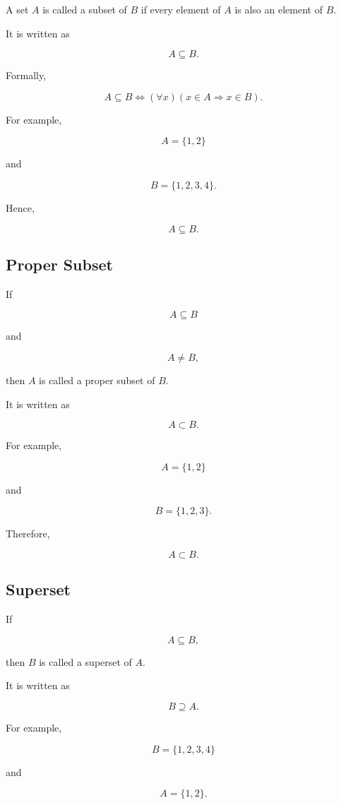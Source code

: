 \documentclass[12pt,a4paper]{article}
\begin{document}
A set $A$ is called a subset of $B$ if every element of $A$ is also an element
of $B$.

It is written as

\[
A\subseteq B.
\]

Formally,

\[
A\subseteq B
\iff
(\forall x)(x\in A\Rightarrow x\in B).
\]

For example,

\[
A=\{1,2\}
\]

and

\[
B=\{1,2,3,4\}.
\]

Hence,

\[
A\subseteq B.
\]


\subsection{Proper Subset}

If

\[
A\subseteq B
\]

and

\[
A\neq B,
\]

then $A$ is called a proper subset of $B$.

It is written as

\[
A\subset B.
\]

For example,

\[
A=\{1,2\}
\]

and

\[
B=\{1,2,3\}.
\]

Therefore,

\[
A\subset B.
\]


\subsection{Superset}

If

\[
A\subseteq B,
\]

then $B$ is called a superset of $A$.

It is written as

\[
B\supseteq A.
\]

For example,

\[
B=\{1,2,3,4\}
\]

and

\[
A=\{1,2\}.
\]
\end{document}
